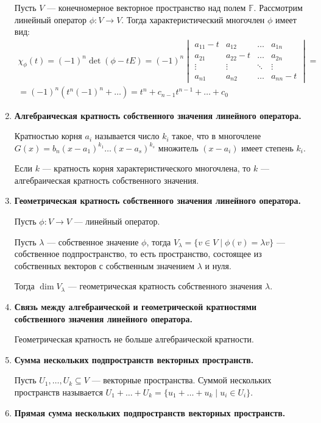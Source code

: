 \begin{enumerate}
Пусть $V$ --- конечномерное векторное пространство над полем $\mathbb{F}$. Рассмотрим линейный оператор $\phi: V \to V$. Тогда характеристический многочлен $\phi$ имеет вид:
	\begin{gather*}
	\chi_{\phi}(t) = (-1)^n\det(\phi - tE) = (-1)^n
  \begin{vmatrix}
  a_{11} - t & a_{12} &\ldots &a_{1n}\\
  a_{21} & a_{22} - t &\ldots &a_{2n} \\
  \vdots &\vdots &\ddots &\vdots\\
  a_{n1} &a_{n2} &\ldots & a_{nn} - t
  \end{vmatrix}
  = \\ 
  = (-1)^n(t^n(-1)^n + \ldots)  = t^n + c_{n-1}t^{n-1} + \ldots + c_0
  \end{gather*}
\item \textbf{Алгебраическая кратность собственного значения линейного оператора.}

Кратностью корня $a_i$ называется число $k_i$ такое, что в многочлене \\$G(x) = b_n(x - a_1)^{k_1}\ldots(x - a_s)^{k_s}$ множитель $(x - a_i)$ имеет степень $k_i$.

Если $k$ --- кратность корня характеристического многочлена, то $k$ --- алгебраическая кратность собственного значения.
\item \textbf{Геометрическая кратность собственного значения линейного оператора.}

Пусть $\phi\colon V \rightarrow V$ --- линейный оператор.

Пусть $\lambda$ --- собственное значение $\phi$, тогда $V_\lambda = \{v \in V \; | \; \phi(v) = \lambda v\}$ --- собственное подпространство, то есть пространство, состоящее из собственных векторов с собственным значением $\lambda$ и нуля.

Тогда $\dim V_\lambda$ --- геометрическая кратность собственного значения $\lambda$.
\item \textbf{Связь между алгебраической и геометрической кратностями собственного значения линейного оператора.}

Геометрическая кратность не больше алгебраической кратности.
\item \textbf{Сумма нескольких подпространств векторных пространств.}

Пусть $U_1, \ldots, U_k \subseteq V$ --- векторные пространства. Суммой нескольких пространств называется $U_1 + \ldots + U_k = \{u_1 + \ldots + u_k \; | \; u_i \in U_i \}$.
\item \textbf{Прямая сумма нескольких подпространств векторных пространств.}


\end{enumerate}
